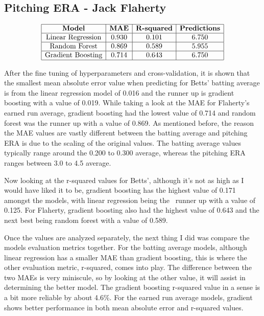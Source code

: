 \documentclass[10pt,twocolumn]{article}
\begin{document}
\subsection*{Pitching ERA - Jack Flaherty}
\[
\begin{array}{|c|c|c|c|}
\hline
\textbf{Model} & \textbf{MAE} & \textbf{R-squared} & \textbf{Predictions} \\ \hline
\text{Linear Regression} & 0.930 & 0.101 & 6.750 \\ \hline
\text{Random Forest} & 0.869 & 0.589 & 5.955 \\ \hline
\text{Gradient Boosting} & 0.714 & 0.643 & 6.750 \\ \hline
\end{array}
\]

    After the fine tuning of hyperparameters and cross-validation, it is shown that the smallest mean absolute error value when predicting for Betts’ batting average is from the linear regression model of 0.016 and the runner up is gradient boosting with a value of 0.019. While taking a look at the MAE for Flaherty’s earned run average, gradient boosting had the lowest value of 0.714 and random forest was the runner up with a value of 0.869. As mentioned before, the reason the MAE values are vastly different between the batting average and pitching ERA is due to the scaling of the original values. The batting average values typically range around the 0.200 to 0.300 average, whereas the pitching ERA ranges between 3.0 to 4.5 average. 
    
    Now looking at the r-squared values for Betts’, although it’s not as high as I would have liked it to be, gradient boosting has the highest value of 0.171 amongst the models, with linear regression being the  runner up with a value of 0.125. For Flaherty, gradient boosting also had the highest value of 0.643 and the next best being random forest with a value of 0.589.  
    
    Once the values are analyzed separately, the next thing I did was compare the models evaluation metrics together. For the batting average models, although linear regression has a smaller MAE than gradient boosting, this is where the other evaluation metric, r-squared, comes into play. The difference between the two MAEs is very miniscule, so by looking at the other value, it will assist in determining the better model. The gradient boosting r-squared value in a sense is a bit more reliable by about 4.6\%. For the earned run average models, gradient shows better performance in both mean absolute error and r-squared values. 
\end{document}

